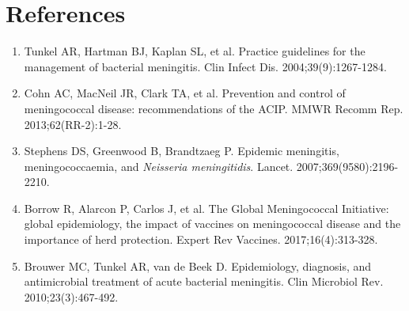 \section*{References}
\begin{enumerate}
  \item Tunkel AR, Hartman BJ, Kaplan SL, et al. Practice guidelines for the management of bacterial meningitis. Clin Infect Dis. 2004;39(9):1267-1284.
  \item Cohn AC, MacNeil JR, Clark TA, et al. Prevention and control of meningococcal disease: recommendations of the ACIP. MMWR Recomm Rep. 2013;62(RR-2):1-28.
  \item Stephens DS, Greenwood B, Brandtzaeg P. Epidemic meningitis, meningococcaemia, and \textit{Neisseria meningitidis}. Lancet. 2007;369(9580):2196-2210.
  \item Borrow R, Alarcon P, Carlos J, et al. The Global Meningococcal Initiative: global epidemiology, the impact of vaccines on meningococcal disease and the importance of herd protection. Expert Rev Vaccines. 2017;16(4):313-328.
  \item Brouwer MC, Tunkel AR, van de Beek D. Epidemiology, diagnosis, and antimicrobial treatment of acute bacterial meningitis. Clin Microbiol Rev. 2010;23(3):467-492.
\end{enumerate}

\clearpage
